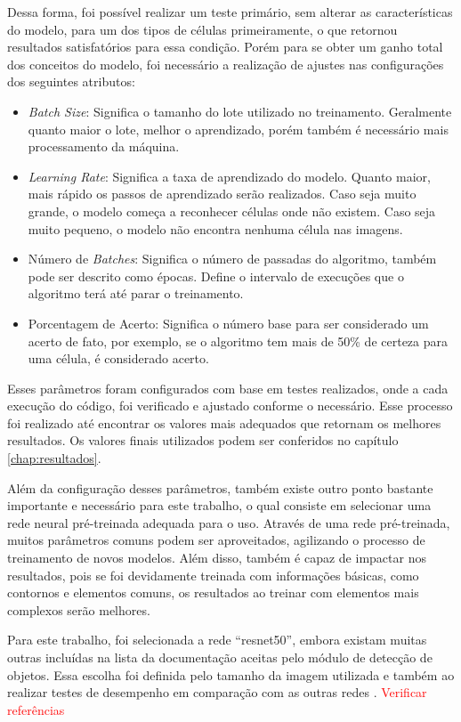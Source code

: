 Dessa forma, foi possível realizar um teste primário, sem alterar as características do modelo, para um dos tipos de células primeiramente, o que retornou resultados satisfatórios para essa condição. Porém para se obter um ganho total dos conceitos do modelo, foi necessário a realização de ajustes nas configurações dos seguintes atributos:

\begin{itemize}
    \item \emph{Batch Size}: Significa o tamanho do lote utilizado no treinamento. Geralmente quanto maior o lote, melhor o aprendizado, porém também é necessário mais processamento da máquina.
    \item \emph{Learning Rate}: Significa a taxa de aprendizado do modelo. Quanto maior, mais rápido os passos de aprendizado serão realizados. Caso seja muito grande, o modelo começa a reconhecer células onde não existem. Caso seja muito pequeno, o modelo não encontra nenhuma célula nas imagens.
    \item Número de \emph{Batches}: Significa o número de passadas do algoritmo, também pode ser descrito como épocas. Define o intervalo de execuções que o algoritmo terá até parar o treinamento.
    \item Porcentagem de Acerto: Significa o número base para ser considerado um acerto de fato, por exemplo, se o algoritmo tem mais de 50\% de certeza para uma célula, é considerado acerto.
\end{itemize}

Esses parâmetros foram configurados com base em testes realizados, onde a cada execução do código, foi verificado e ajustado conforme o necessário. Esse processo foi realizado até encontrar os valores mais adequados que retornam os melhores resultados. Os valores finais utilizados podem ser conferidos no capítulo \ref{chap:resultados}.

Além da configuração desses parâmetros, também existe outro ponto bastante importante e necessário para este trabalho, o qual consiste em selecionar uma rede neural pré-treinada adequada para o uso. Através de uma rede pré-treinada, muitos parâmetros comuns podem ser aproveitados, agilizando o processo de treinamento de novos modelos. Além disso, também é capaz de impactar nos resultados, pois se foi devidamente treinada com informações básicas, como contornos e elementos comuns, os resultados ao treinar com elementos mais complexos serão melhores.

Para este trabalho, foi selecionada a rede ``resnet50'', embora existam muitas outras incluídas na lista da documentação aceitas pelo módulo de detecção de objetos. Essa escolha foi definida pelo tamanho da imagem utilizada e também ao realizar testes de desempenho em comparação com as outras redes \cite{websiteObjectDetection}. \textcolor{red}{Verificar referências}

